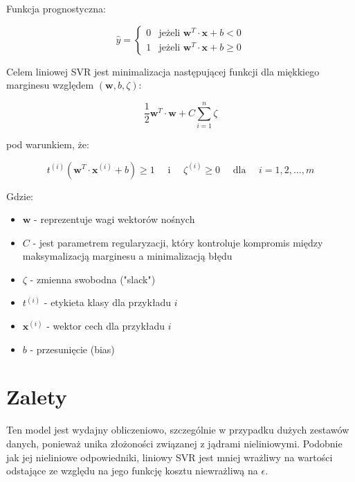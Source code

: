 Funkcja prognostyczna:

$$
\hat{y} ={ \begin{cases}
    0 & \text{jeżeli } \boldsymbol{w}^T \cdot \boldsymbol{x} + b \lt 0 \\
    1 & \text{jeżeli } \boldsymbol{w}^T \cdot \boldsymbol{x} + b \geq 0
\end{cases}}
$$


Celem liniowej SVR jest minimalizacja następującej funkcji dla miękkiego marginesu względem $( \boldsymbol{w},b,\zeta)$:

$$
\frac{1}{2} \boldsymbol{w}^T \cdot \boldsymbol{w} + C \sum_{i=1}^{n} \zeta
$$

pod warunkiem, że:

$$
t^{(i)}(\boldsymbol{w}^T \cdot \boldsymbol{x}^{(i)} + b) \geq 1 \quad \text{ i } \quad \zeta^{(i)} \geq 0 \quad \text{ dla } \quad i=1,2,\dots,m
$$

Gdzie:
\begin{itemize}
\setlength\itemsep{-0.5em}
 \item  $\boldsymbol{w}$ - reprezentuje wagi wektorów nośnych

\item $C$ - jest parametrem regularyzacji, który kontroluje kompromis między maksymalizacją marginesu a minimalizacją błędu

 \item  $\zeta$ - zmienna swobodna ("slack")

 \item  $t^{(i)}$ - etykieta klasy dla przykładu $i$

 \item  $\boldsymbol{x}^{(i)}$ - wektor cech dla przykładu $i$

\item $b$ - przesunięcie (bias)
\end{itemize}


{}
\section*{Zalety }
\vspace{-1.0em}
\label{sec:ml_challenges}

Ten model jest wydajny obliczeniowo, szczególnie w przypadku dużych zestawów danych, ponieważ unika złożoności związanej z jądrami nieliniowymi.
Podobnie jak jej nieliniowe odpowiedniki, liniowy SVR jest mniej wrażliwy na wartości odstające ze względu na jego funkcję kosztu niewrażliwą na $\epsilon$.


